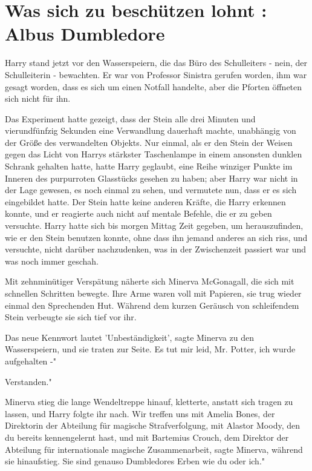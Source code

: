 \chapter{Was sich zu beschützen lohnt : Albus Dumbledore}

Harry stand jetzt vor den Wasserspeiern, die das Büro des Schulleiters - nein,
der Schulleiterin - bewachten. Er war von Professor Sinistra gerufen worden, ihm
war gesagt worden, dass es sich um einen Notfall handelte, aber die Pforten
öffneten sich nicht für ihn.

Das Experiment hatte gezeigt, dass der Stein alle drei Minuten und
vierundfünfzig Sekunden eine Verwandlung dauerhaft machte, unabhängig von der
Größe des verwandelten Objekts. Nur einmal, als er den Stein der Weisen gegen
das Licht von Harrys stärkster Taschenlampe in einem ansonsten dunklen Schrank
gehalten hatte, hatte Harry geglaubt, eine Reihe winziger Punkte im Inneren des
purpurroten Glasstücks gesehen zu haben; aber Harry war nicht in der Lage
gewesen, es noch einmal zu sehen, und vermutete nun, dass er es sich eingebildet
hatte. Der Stein hatte keine anderen Kräfte, die Harry erkennen konnte, und er
reagierte auch nicht auf mentale Befehle, die er zu geben versuchte. Harry hatte
sich bis morgen Mittag Zeit gegeben, um herauszufinden, wie er den Stein
benutzen konnte, ohne dass ihn jemand anderes an sich riss, und versuchte, nicht
darüber nachzudenken, was in der Zwischenzeit passiert war und was noch immer
geschah.

Mit zehnminütiger Verspätung näherte sich Minerva McGonagall, die sich mit
schnellen Schritten bewegte. Ihre Arme waren voll mit Papieren, sie trug wieder
einmal den Sprechenden Hut. Während dem kurzen Geräusch von schleifendem Stein
verbeugte sie sich tief vor ihr.

\glqq Das neue Kennwort lautet 'Unbeständigkeit'\grqq{}, sagte Minerva zu den
Wasserspeiern, und sie traten zur Seite. \glqq Es tut mir leid, Mr. Potter, ich
wurde aufgehalten -"

\glqq Verstanden."

Minerva stieg die lange Wendeltreppe hinauf, kletterte, anstatt sich tragen zu
lassen, und Harry folgte ihr nach. \glqq Wir treffen uns mit Amelia Bones, der
Direktorin der Abteilung für magische Strafverfolgung, mit Alastor Moody, den du
bereits kennengelernt hast, und mit Bartemius Crouch, dem Direktor der Abteilung
für internationale magische Zusammenarbeit\grqq{}, sagte Minerva, während sie
hinaufstieg. \glqq Sie sind genauso Dumbledores Erben wie du oder ich."

